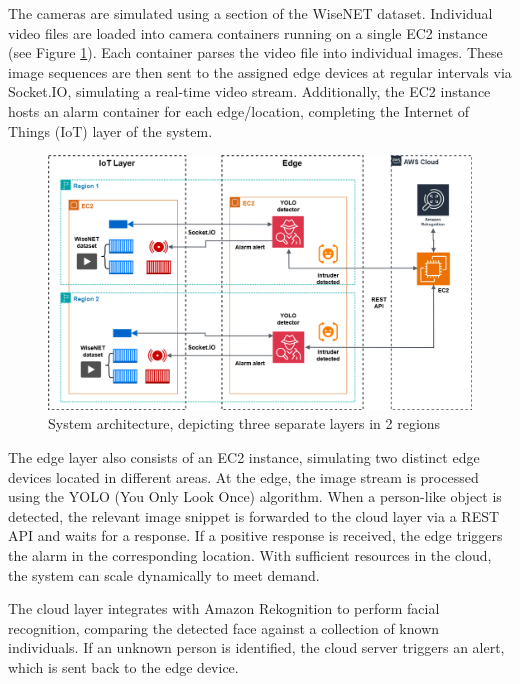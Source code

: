 \documentclass[conference]{IEEEtran}
\begin{document}
The cameras are simulated using a section of the WiseNET dataset. Individual video files are loaded into camera containers running on a single EC2 instance (see Figure \ref{fig:architecture}). Each container parses the video file into individual images. These image sequences are then sent to the assigned edge devices at regular intervals via Socket.IO, simulating a real-time video stream. Additionally, the EC2 instance hosts an alarm container for each edge/location, completing the Internet of Things (IoT) layer of the system.

\begin{figure}[h!]
    \centering
    \includegraphics[width=1\linewidth]{res/DS_architecture_final.png}
    \caption{System architecture, depicting three separate layers in 2 regions}
    \label{fig:architecture}
\end{figure}

The edge layer also consists of an EC2 instance, simulating two distinct edge devices located in different areas. At the edge, the image stream is processed using the YOLO (You Only Look Once) algorithm. When a person-like object is detected, the relevant image snippet is forwarded to the cloud layer via a REST API and waits for a response. If a positive response is received, the edge triggers the alarm in the corresponding location. With sufficient resources in the cloud, the system can scale dynamically to meet demand.

The cloud layer integrates with Amazon Rekognition to perform facial recognition, comparing the detected face against a collection of known individuals. If an unknown person is identified, the cloud server triggers an alert, which is sent back to the edge device.
\end{document}
